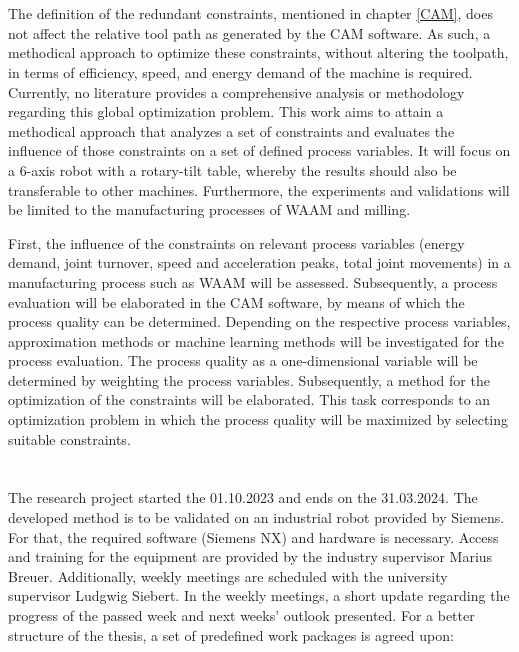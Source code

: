 \documentclass[ZLstudentexpose%
              ,optBiber%
              ,optEnglish%
              ,10pt
              ]{ZLlatex}%
\begin{document}
\newpage
\section{}%
The definition of the redundant constraints, mentioned in chapter \ref{CAM}, does not affect the relative tool path as generated by the CAM software. As such, a methodical approach to optimize these constraints, without altering the toolpath, in terms of efficiency, speed, and energy demand of the machine is required. Currently, no literature provides a comprehensive analysis or methodology regarding this global optimization problem.
This work aims to attain a methodical approach that analyzes a set of constraints and evaluates the influence of those constraints on a set of defined process variables. It will focus on a 6-axis robot with a rotary-tilt table, whereby the results should also be transferable to other machines. Furthermore, the experiments and validations will be limited to the manufacturing processes of WAAM and milling. 


First, the influence of the constraints on relevant process variables (energy demand, joint turnover, speed and acceleration peaks, total joint movements) in a manufacturing process such as WAAM will be assessed. Subsequently, a process evaluation will be elaborated in the CAM software, by means of which the process quality can be determined. Depending on the respective process variables, approximation methods or machine learning methods will be investigated for the process evaluation. The process quality as a one-dimensional variable will be determined by weighting the process variables. Subsequently, a method for the optimization of the constraints will be elaborated. This task corresponds to an optimization problem in which the process quality will be maximized by selecting suitable constraints. 


\section{}%
The research project started the 01.10.2023 and ends on the 31.03.2024. The developed method is to be validated on an industrial robot provided by Siemens. For that, the required software (Siemens NX) and hardware is necessary. Access and training for the equipment are provided by the industry supervisor Marius Breuer. 
Additionally, weekly meetings are scheduled with the university supervisor Ludgwig Siebert. In the weekly meetings, a short update regarding the progress of the passed week and next weeks' outlook presented. \newline
For a better structure of the thesis, a set of predefined work packages is agreed upon:
\end{document}
